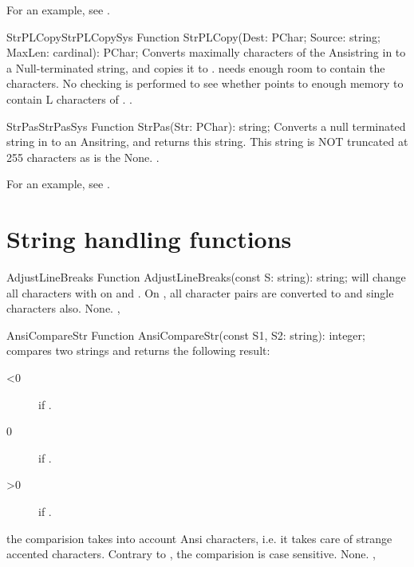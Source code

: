For an example, see .

\begin{functionl}{StrPLCopy}{StrPLCopySys}
\Declaration
Function StrPLCopy(Dest: PChar; Source: string; MaxLen: cardinal): PChar;
\Description
{} Converts maximally  characters of the 
Ansistring in  to a Null-terminated  string, and copies 
it to .  needs enough room to contain
the  characters.
\Errors
No checking is performed to see whether  points to enough memory
to contain L characters of .
\Errors
\SeeAlso
{}.
\end{functionl}


\begin{functionl}{StrPas}{StrPasSys}
\Declaration
Function StrPas(Str: PChar): string;
\Description
Converts a null terminated string in  to an Ansitring, and returns
this string. This string is NOT truncated at 255 characters as is the 
\Errors
None.
\SeeAlso
{}.
\end{functionl}

For an example, see .

\section{String handling functions}

\begin{function}{AdjustLineBreaks}
\Declaration
Function AdjustLineBreaks(const S: string): string;
\Description
{} will change all  characters with
 on \windowsnt and \dos. On \linux, all 
character pairs are converted to  and single 
characters also.
\Errors
None.
\SeeAlso
{}, 
\end{function}


 
\begin{function}{AnsiCompareStr}
\Declaration
Function AnsiCompareStr(const S1, S2: string): integer;
\Description
{} compares two strings and returns the following
result:
\begin{description}
\item[<0]  if .
\item[0]  if .
\item[>0] if .
\end{description}
the comparision takes into account Ansi characters, i.e. it takes
care of strange accented characters. Contrary to , 
the comparision is case sensitive.
\Errors
None.
\SeeAlso
{}, 
\end{function}

